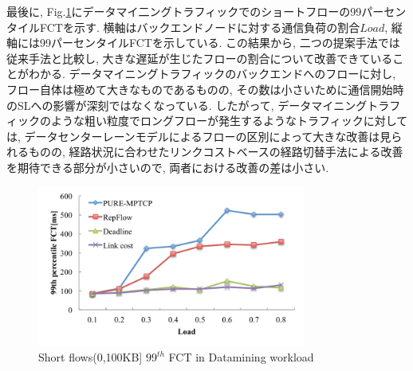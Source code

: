 最後に, 
Fig.\ref{fig:datamining_FCT_tails}にデータマイ二ングトラフィックでのショートフローの99パーセンタイルFCTを示す.
横軸はバックエンドノードに対する通信負荷の割合$Load$, 縦軸には99パーセンタイルFCTを示している. 
この結果から, 二つの提案手法では従来手法と比較し, 大きな遅延が生じたフローの割合について改善できていることがわかる. 
データマイニングトラフィックのバックエンドへのフローに対し, フロー自体は極めて大きなものであるものの,
その数は小さいために通信開始時のSLへの影響が深刻ではなくなっている. 
したがって, データマイニングトラフィックのような粗い粒度でロングフローが発生するようなトラフィックに対しては,
データセンターレーンモデルによるフローの区別によって大きな改善は見られるものの,
経路状況に合わせたリンクコストベースの経路切替手法による改善を期待できる部分が小さいので, 両者における改善の差は小さい. 
\begin{figure}[t]
    \begin{center}
    \includegraphics[autoebb, width=250pt]{./img/mining_tail.pdf}
    \caption{Short flows(0,100KB] $99^{th}$ FCT in Datamining workload}
    \label{fig:datamining_FCT_tails}
    \end{center}
\end{figure}

